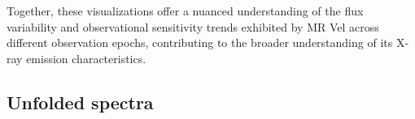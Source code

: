     Together, these visualizations offer a nuanced understanding of the flux variability and observational sensitivity trends exhibited by MR Vel across different observation epochs, contributing to the broader understanding of its X-ray emission characteristics.

    \subsection{Unfolded spectra}
